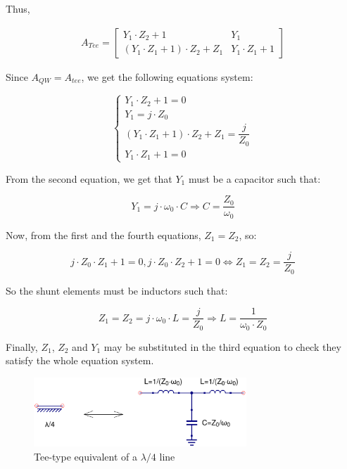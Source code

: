 \noindent Thus,

\begin{gather}
  A_{Tee} = 
 \begin{bmatrix} Y_1 \cdot Z_2 + 1 & Y_1 \\ (Y_1 \cdot Z_1 + 1) \cdot Z_2 + Z_1 & Y_1 \cdot Z_1 + 1 \end{bmatrix}
 \label{eq:tee-network-equivalent}
\end{gather}

\noindent Since $A_{QW} = A_{tee}$, we get the following equations system:

\begin{equation}
\begin{cases} Y_1 \cdot Z_2 + 1 = 0\\ Y_1 = j\cdot Z_0 \\ (Y_1 \cdot Z_1 + 1) \cdot Z_2 + Z_1 = \dfrac{j}{Z_0} \\ Y_1 \cdot Z_1 + 1 = 0\end{cases} 
\end{equation}

\noindent From the second equation, we get that $Y_1$ must be a capacitor such that:

\begin{equation}
Y_1 = j\cdot \omega_0 \cdot C \Longrightarrow C = \dfrac{Z_0}{\omega_0}
\end{equation}

\noindent Now, from the first and the fourth equations, $Z_1 = Z_2$, so:

\begin{equation}
j \cdot Z_0 \cdot Z_1 + 1 = 0, j \cdot Z_0 \cdot Z_2 + 1 = 0 \iff Z_1 = Z_2 = \dfrac{j}{Z_0}
\end{equation}

\noindent So the shunt elements must be inductors such that:

\begin{equation}
Z_1 = Z_2 = j \cdot \omega_0 \cdot L = \dfrac{j}{Z_0} \Longrightarrow L = \dfrac{1}{\omega_0 \cdot Z_0}
\end{equation}

\noindent Finally, $Z_1$, $Z_2$ and $Y_1$ may be substituted in the third equation to check they satisfy the whole equation system.

\begin{figure}[ht]
\begin{center}
\includegraphics[width=8cm]{Tee-equivalent-l4}
\end{center}
\caption{Tee-type equivalent of a $\lambda/4$ line}
\label{fig:tee-eq-l4}
\end{figure}
\FloatBarrier

